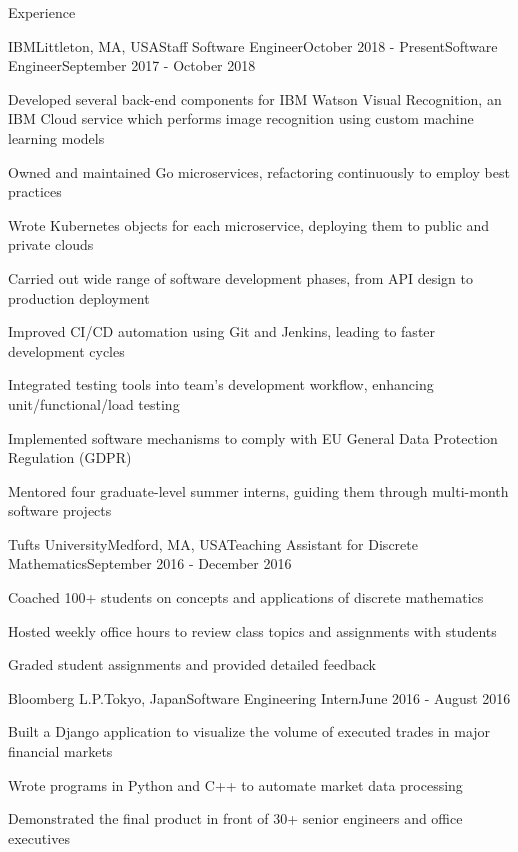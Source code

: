 \documentclass{resume}
\begin{document}
  \begin{rSection}{Experience}
    \begin{rSubsection}{IBM}{Littleton, MA, USA}{Staff Software Engineer}{October 2018 - Present}{Software Engineer}{September 2017 - October 2018}
    \item Developed several back-end components for IBM Watson Visual Recognition, an IBM Cloud service which performs image recognition using custom machine learning models
    \item Owned and maintained Go microservices, refactoring continuously to employ best practices
    \item Wrote Kubernetes objects for each microservice, deploying them to public and private clouds
    \item Carried out wide range of software development phases, from API design to production deployment
    \item Improved CI/CD automation using Git and Jenkins, leading to faster development cycles
    \item Integrated testing tools into team's development workflow, enhancing unit/functional/load testing
    \item Implemented software mechanisms to comply with EU General Data Protection Regulation (GDPR)
    \item Mentored four graduate-level summer interns, guiding them through multi-month software projects
    \end{rSubsection}
    
    \begin{rSubsection}{Tufts University}{Medford, MA, USA}{Teaching Assistant for Discrete Mathematics}{September 2016 - December 2016}{}{}
    \item Coached 100+ students on concepts and applications of discrete mathematics
    \item Hosted weekly office hours to review class topics and assignments with students
    \item Graded student assignments and provided detailed feedback
    \end{rSubsection}
    
    \begin{rSubsection}{Bloomberg L.P.}{Tokyo, Japan}{Software Engineering Intern}{June 2016 - August 2016}{}{}
    \item Built a Django application to visualize the volume of executed trades in major financial markets
    \item Wrote programs in Python and C++ to automate market data processing
    \item Demonstrated the final product in front of 30+ senior engineers and office executives
    \end{rSubsection}
  
  \end{rSection}
\end{document}
